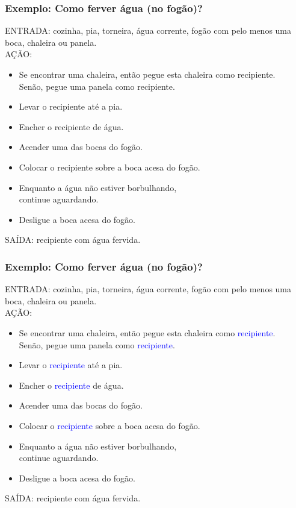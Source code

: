 \documentclass[hyperref={pdfpagelabels=false}]{beamer}
\newcommand{\blue}[1]{\textcolor{blue}{#1}}
\begin{document}
\begin{frame}
   \frametitle{Exemplo: Como ferver água (no fogão)?}
   ENTRADA: cozinha, pia, torneira, água corrente, fogão com pelo menos uma boca, chaleira ou panela.\\
   AÇÃO: 
   \begin{itemize}
      \item \alert{Se} encontrar uma chaleira, então pegue esta chaleira como recipiente. \\
				\alert{Senão}, pegue uma panela como recipiente.
      \item Levar o recipiente até a pia.
      \item Encher o recipiente de água.
      \item Acender uma das bocas do fogão.
      \item Colocar o recipiente sobre a boca acesa do fogão.
      \item \alert{Enquanto} a água não estiver borbulhando, \\
				\alert{continue} aguardando.
      \item Desligue a boca acesa do fogão.
   \end{itemize}
	SAÍDA: recipiente com água fervida.
\end{frame}
\begin{frame}
   \frametitle{Exemplo: Como ferver água (no fogão)?}
   ENTRADA: cozinha, pia, torneira, água corrente, fogão com pelo menos uma boca, chaleira ou panela.\\
   AÇÃO: 
   \begin{itemize}
		\item Se encontrar uma chaleira, então pegue esta chaleira como \blue{recipiente}. \\
		      Senão, pegue uma panela como \blue{recipiente}.
      \item Levar o \blue{recipiente} até a pia.
      \item Encher o \blue{recipiente} de água.
      \item Acender uma das bocas do fogão.
      \item Colocar o \blue{recipiente} sobre a boca acesa do fogão.
      \item Enquanto a água não estiver borbulhando, \\
			   continue aguardando.
      \item Desligue a boca acesa do fogão.
   \end{itemize}
   SAÍDA: recipiente com água fervida.
\end{frame}
\end{document}
